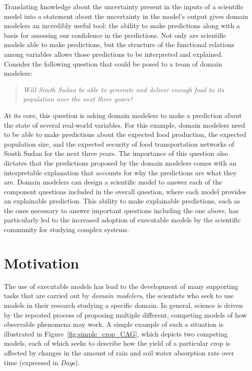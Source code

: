 Translating knowledge about the uncertainty present in the inputs of a scientific model into a statement about the uncertainty in the model's output gives domain modelers an incredibly useful tool: the ability to make predictions along with a basis for assessing our confidence in the predictions.
Not only are scientific models able to make predictions, but the structure of the functional relations among variables allows those predictions to be interpreted and explained.
Consider the following question that could be posed to a team of domain modelers:
\begin{quote}
\textit{Will South Sudan be able to generate and deliver enough food to its population over the next three years?}
\end{quote}
At its core, this question is asking domain modelers to make a prediction about the state of several real-world variables.
For this example, domain modelers need to be able to make predictions about the expected food production, the expected population size, and the expected security of food transportation networks of South Sudan for the next three years.
The importance of this question also dictates that the predictions proposed by the domain modelers comes with an interpretable explanation that accounts for why the predictions are what they are.
Domain modelers can design a scientific model to answer each of the component questions included in the overall question, where each model provides an explainable prediction.
This ability to make explainable predictions, such as the ones necessary to answer important questions including the one above, has particularly led to the increased adoption of executable models by the scientific community for studying complex systems.

\section{Motivation\label{sec:motivation}}
The use of executable models has lead to the development of many supporting tasks that are carried out by \emph{domain modelers}, the scientists who seek to use models in their research studying a specific domain.
In general, science is driven by the repeated process of proposing multiple different, competing models of how observable phenomena may work.
A simple example of such a situation is illustrated in Figure~\ref{fig:simple_crop_CAG}, which depicts two competing models, each of which seeks to describe how the yield of a particular crop is affected by changes in the amount of rain and soil water absorption rate over time (expressed in \emph{Day}s).

